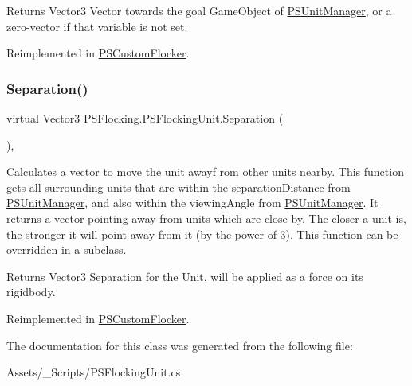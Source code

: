 \begin{DoxyReturn}{Returns}
Vector3 Vector towards the goal Game\+Object of \hyperlink{class_p_s_flocking_1_1_p_s_unit_manager}{P\+S\+Unit\+Manager}, or a zero-\/vector if that variable is not set. 
\end{DoxyReturn}


Reimplemented in \hyperlink{class_p_s_custom_flocker_a43590dd2fdf5f37d2116cf08473375c7}{P\+S\+Custom\+Flocker}.

\mbox{\label{class_p_s_flocking_1_1_p_s_flocking_unit_af486901d480a5520aeae135d46635e60}} 
\subsubsection{\texorpdfstring{Separation()}{Separation()}}
{\footnotesize\ttfamily virtual Vector3 P\+S\+Flocking.\+P\+S\+Flocking\+Unit.\+Separation (\begin{DoxyParamCaption}{ }\end{DoxyParamCaption})\hspace{0.3cm}{\ttfamily [protected]}, {\ttfamily [virtual]}}



Calculates a vector to move the unit awayf rom other units nearby. This function gets all surrounding units that are within the separation\+Distance from \hyperlink{class_p_s_flocking_1_1_p_s_unit_manager}{P\+S\+Unit\+Manager}, and also within the viewing\+Angle from \hyperlink{class_p_s_flocking_1_1_p_s_unit_manager}{P\+S\+Unit\+Manager}. It returns a vector pointing away from units which are close by. The closer a unit is, the stronger it will point away from it (by the power of 3). This function can be overridden in a subclass. 

\begin{DoxyReturn}{Returns}
Vector3 Separation for the Unit, will be applied as a force on its rigidbody. 
\end{DoxyReturn}


Reimplemented in \hyperlink{class_p_s_custom_flocker_a2ab0990e603a5102fc80dafee1333c7c}{P\+S\+Custom\+Flocker}.



The documentation for this class was generated from the following file\+:\begin{DoxyCompactItemize}
\item 
Assets/\+\_\+\+Scripts/P\+S\+Flocking\+Unit.\+cs\end{DoxyCompactItemize}
